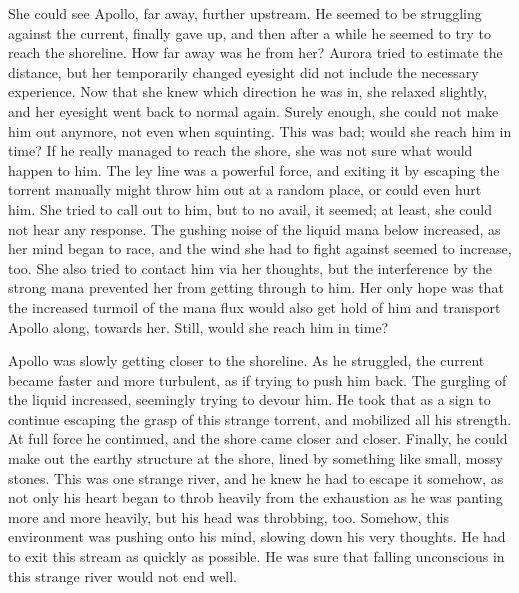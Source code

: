 She could see Apollo, far away, further upstream. He seemed to be struggling against the current, finally gave up, and then after a while he seemed to try to reach the shoreline. How far away was he from her? Aurora tried to estimate the distance, but her temporarily changed eyesight did not include the necessary experience. Now that she knew which direction he was in, she relaxed slightly, and her eyesight went back to normal again. Surely enough, she could not make him out anymore, not even when squinting. This was bad; would she reach him in time? If he really managed to reach the shore, she was not sure what would happen to him. The ley line was a powerful force, and exiting it by escaping the torrent manually might throw him out at a random place, or could even hurt him. She tried to call out to him, but to no avail, it seemed; at least, she could not hear any response. The gushing noise of the liquid mana below increased, as her mind began to race, and the wind she had to fight against seemed to increase, too. She also tried to contact him via her thoughts, but the interference by the strong mana prevented her from getting through to him. Her only hope was that the increased turmoil of the mana flux would also get hold of him and transport Apollo along, towards her. Still, would she reach him in time?

\froufrou{}

Apollo was slowly getting closer to the shoreline. As he struggled, the current became faster and more turbulent, as if trying to push him back. The gurgling of the liquid increased, seemingly trying to devour him. He took that as a sign to continue escaping the grasp of this strange torrent, and mobilized all his strength. At full force he continued, and the shore came closer and closer. Finally, he could make out the earthy structure at the shore, lined by something like small, mossy stones. This was one strange river, and he knew he had to escape it somehow, as not only his heart began to throb heavily from the exhaustion as he was panting more and more heavily, but his head was throbbing, too. Somehow, this environment was pushing onto his mind, slowing down his very thoughts. He had to exit this stream as quickly as possible. He was sure that falling unconscious in this strange river would not end well.

